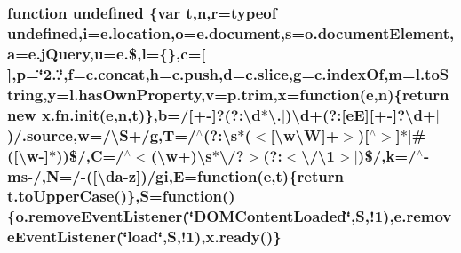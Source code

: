 \hypertarget{jquery-2_80_83_8min_8js_a08113a236cc18d2a9d5ce27e638012be}{
\subsubsection[{undefined}]{\setlength{\rightskip}{0pt plus 5cm}function undefined \{var {\bf t},n,r=typeof undefined,i=e.\+location,o=e.\+document,s=o.\+document\+Element,a=e.\+j\+Query,u=e.\$,l=\{\},c=\mbox{[}$\,$\mbox{]},p=\char`\"{}2..\char`\"{},f=c.\+concat,h=c.\+push,d=c.\+slice,g=c.\+index\+Of,m=l.\+to\+String,y=l.\+has\+Own\+Property,v=p.\+trim,x=function({\bf e},n)\{return new x.\+fn.\+init({\bf e},n,{\bf t})\},b=/\mbox{[}+-\/\mbox{]}?(?\+:\textbackslash{}d$\ast$\textbackslash{}.$\vert$)\textbackslash{}d+(?\+:\mbox{[}e\+E\mbox{]}\mbox{[}+-\/\mbox{]}?\textbackslash{}d+$\vert$)/.source,w=/\textbackslash{}S+/g,T=/$^\wedge$(?\+:\textbackslash{}s$\ast$($<$\mbox{[}\textbackslash{}w\textbackslash{}\+W\mbox{]}+$>$)\mbox{[}$^\wedge$$>$\mbox{]}$\ast$$\vert$\#(\mbox{[}\textbackslash{}w-\/\mbox{]}$\ast$))\$/,C=/$^\wedge$$<$(\textbackslash{}w+)\textbackslash{}s$\ast$\textbackslash{}/?$>$(?\+:$<$\textbackslash{}/\textbackslash{}1$>$$\vert$)\$/,k=/$^\wedge$-\/ms-\//,N=/-\/(\mbox{[}\textbackslash{}da-\/z\mbox{]})/gi,E=function({\bf e},{\bf t})\{return t.\+to\+Upper\+Case()\},S=function()\{o.\+remove\+Event\+Listener(\char`\"{}D\+O\+M\+Content\+Loaded\char`\"{},S,!1),e.\+remove\+Event\+Listener(\char`\"{}load\char`\"{},S,!1),{\bf x.\+ready}()\}}}\label{jquery-2_80_83_8min_8js_a08113a236cc18d2a9d5ce27e638012be}

